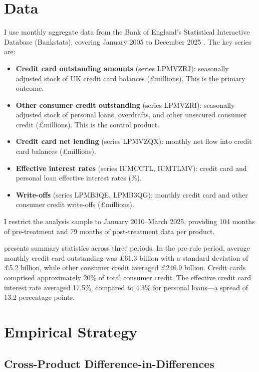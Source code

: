 \documentclass[12pt]{article}
\begin{document}
\section{Data}

I use monthly aggregate data from the Bank of England's Statistical Interactive Database (Bankstats), covering January 2005 to December 2025 \citep{boe2024}. The key series are:

\begin{itemize}
\item \textbf{Credit card outstanding amounts} (series LPMVZRJ): seasonally adjusted stock of UK credit card balances (\pounds millions). This is the primary outcome.
\item \textbf{Other consumer credit outstanding} (series LPMVZRI): seasonally adjusted stock of personal loans, overdrafts, and other unsecured consumer credit (\pounds millions). This is the control product.
\item \textbf{Credit card net lending} (series LPMVZQX): monthly net flow into credit card balances (\pounds millions).
\item \textbf{Effective interest rates} (series IUMCCTL, IUMTLMV): credit card and personal loan effective interest rates (\%).
\item \textbf{Write-offs} (series LPMB3QE, LPMB3QG): monthly credit card and other consumer credit write-offs (\pounds millions).
\end{itemize}

I restrict the analysis sample to January 2010--March 2025, providing 104 months of pre-treatment and 79 months of post-treatment data per product.



 presents summary statistics across three periods. In the pre-rule period, average monthly credit card outstanding was \pounds61.3 billion with a standard deviation of \pounds5.2 billion, while other consumer credit averaged \pounds246.9 billion. Credit cards comprised approximately 20\% of total consumer credit. The effective credit card interest rate averaged 17.5\%, compared to 4.3\% for personal loans---a spread of 13.2 percentage points.

\section{Empirical Strategy}

\subsection{Cross-Product Difference-in-Differences}
\end{document}
